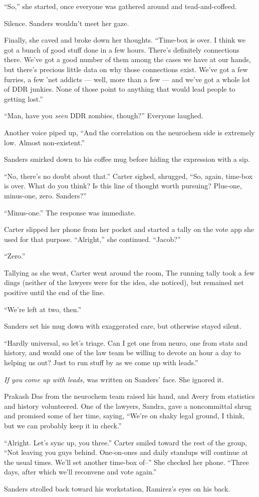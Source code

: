 ``So,'' she started, once everyone was gathered around and tead-and-coffeed.

Silence. Sanders wouldn't meet her gaze.

Finally, she caved and broke down her thoughts. ``Time-box is over. I think we got a bunch of good stuff done in a few hours. There's definitely connections there. We've got a good number of them among the cases we have at our hands, but there's precious little data on why those connections exist. We've got a few furries, a few 'net addicts --- well, more than a few --- and we've got a whole lot of DDR junkies. None of those point to anything that would lead people to getting lost.''

``Man, have you \emph{seen} DDR zombies, though?'' Everyone laughed.

Another voice piped up, ``And the correlation on the neurochem side is extremely low. Almost non-existent.''

Sanders smirked down to his coffee mug before hiding the expression with a sip.

``No, there's no doubt about that.'' Carter sighed, shrugged, ``So, again, time-box is over. What do you think? Is this line of thought worth pursuing? Plus-one, minus-one, zero. Sanders?''

``Minus-one.'' The response was immediate.

Carter slipped her phone from her pocket and started a tally on the vote app she used for that purpose. ``Alright,'' she continued. ``Jacob?''

``Zero.''

Tallying as she went, Carter went around the room, The running tally took a few dings (neither of the lawyers were for the idea, she noticed), but remained net positive until the end of the line.

``We're left at two, then.''

Sanders set his mug down with exaggerated care, but otherwise stayed silent.

``Hardly universal, so let's triage. Can I get one from neuro, one from stats and history, and would one of the law team be willing to devote an hour a day to helping us out? Just to run stuff by as we come up with leads.''

\emph{If you come up with leads,} was written on Sanders' face. She ignored it.

Prakash Das from the neurochem team raised his hand, and Avery from statistics and history volunteered. One of the lawyers, Sandra, gave a noncommittal shrug and promised some of her time, saying, ``We're on shaky legal ground, I think, but we can probably keep it in check.''

``Alright. Let's sync up, you three.'' Carter smiled toward the rest of the group, ``Not leaving you guys behind. One-on-ones and daily standups will continue at the usual times. We'll set another time-box of--'' She checked her phone. ``Three days, after which we'll reconvene and vote again.''

Sanders strolled back toward his workstation, Ramirez's eyes on his back.
